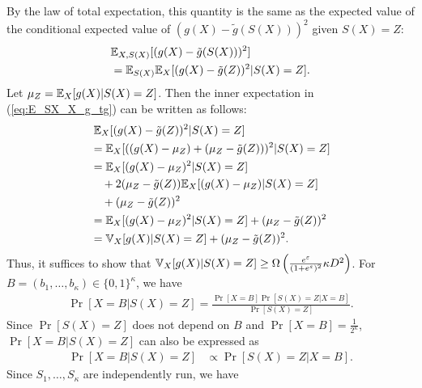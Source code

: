 {%
By the law of total expectation, this quantity is the same as the expected value of the conditional expected value of $(g(X)- \tilde{g}(S(X)))^2$ given 
$S(X) = Z$:
\begin{align}
  &\mathbb{E}_{X, S(X)}[(g(X)- \tilde{g}(S(X)))^2] \nonumber\\
  &= \mathbb{E}_{S(X)} \mathbb{E}_X[(g(X) - \tilde{g}(Z) )^2 | S(X)=Z].
  \label{eq:E_SX_X_g_tg}
\end{align}
Let $\mu_Z = \mathbb{E}_X[g(X)|S(X)=Z]$. 
Then the inner expectation in (\ref{eq:E_SX_X_g_tg}) can be written as follows:
\begin{align*}
  &\; \mathbb{E}_X[(g(X) - \tilde{g}(Z) )^2 | S(X)=Z] \\
  &= \mathbb{E}_X[( (g(X) - \mu_Z) + (\mu_Z - \tilde{g}(Z)) )^2 | S(X)=Z] \\
  &= \mathbb{E}_X[(g(X) - \mu_Z)^2 |S(X)=Z] \\
  &\hspace{3.5mm}+ 2(\mu_Z - \tilde{g}(Z))\mathbb{E}_X[(g(X) - \mu_Z)|S(X)=Z] \\
  &\hspace{3.5mm}+ (\mu_Z - \tilde{g}(Z))^2 \\
  &= \mathbb{E}_X[(g(X) - \mu_Z)^2 |S(X)=Z] + (\mu_Z - \tilde{g}(Z))^2 \\
  &= \mathbb{V}_X[g(X)|S(X)=Z] + (\mu_Z - \tilde{g}(Z))^2.
\end{align*}
Thus, it suffices to show that $\mathbb{V}_X[g(X)|S(X)=Z] \geq
\Omega\left(\frac{e^\varepsilon}{(1+e^\varepsilon)^2} \kappa D^2 \right)$.
For $B = (b_1, \ldots, b_\kappa) \in \{0,1\}^\kappa$, we have
\begin{align*}
  \Pr[X=B|S(X)=Z] = \frac{\Pr[X=B]\Pr[S(X)=Z|X=B]}{\Pr[S(X)=Z]}.
\end{align*}
Since $\Pr[S(X)=Z]$ does not depend on $B$ and
$\Pr[X=B] = \frac{1}{2^\kappa}$, $\Pr[X=B|S(X)=Z]$ can also be expressed as 
\begin{align}
  \Pr[X=B|S(X)=Z] &\propto \Pr[S(X)=Z|X=B].
  \label{eq:X_B_SX_Z_propto}
\end{align}
Since $S_1, \ldots, S_\kappa$ are independently run, we have
}
